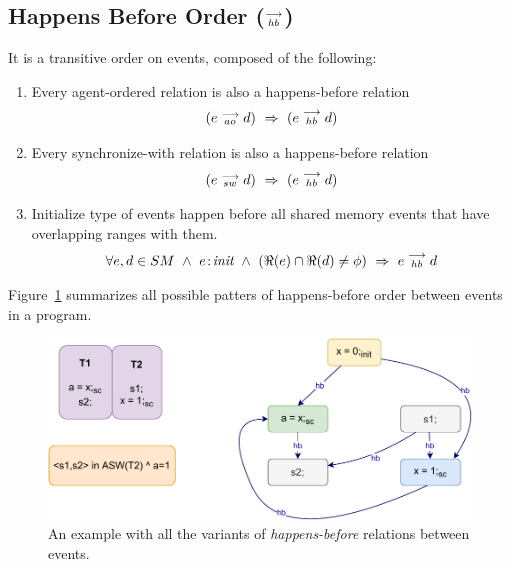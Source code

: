    \subsection{Happens Before Order ($\stackrel{\longrightarrow}{_{hb}}$)}
        It is a transitive order on events, composed of the following:
        \begin{enumerate}
            \item Every agent-ordered relation is also a happens-before relation 
                \begin{align*}
                    (\reln{e}{ao}{d}) \ \Rightarrow{} \ (\reln{e}{hb}{d})    
                \end{align*}
                
            \item Every synchronize-with relation is also a happens-before relation 
                \begin{align*}
                    (\reln{e}{sw}{d}) \ \Rightarrow{} \ (\reln{e}{hb}{d})    
                \end{align*}
                 
            \item Initialize type of events happen before all shared memory events that have overlapping ranges with them. 
                \begin{align*}
                    \forall e,d \in SM \ \wedge \ 
                    \et{e}{init} \ \wedge \ 
                    (\Re(e) \cap \Re(d) \neq \phi)
                    \ \Rightarrow{} \ 
                    \reln{e}{hb}{d}
                \end{align*}          
        \end{enumerate}
        Figure~\ref{model:happens-before} summarizes all possible patters of happens-before order between events in a program.
        \begin{figure}[H]
            \centering
            \includegraphics[scale=0.7]{4.ECMAScriptMemoryModel/Happens-before.pdf}
            \caption{An example with all the variants of \textit{happens-before} relations between events.}
            \label{model:happens-before}
        \end{figure}
    
